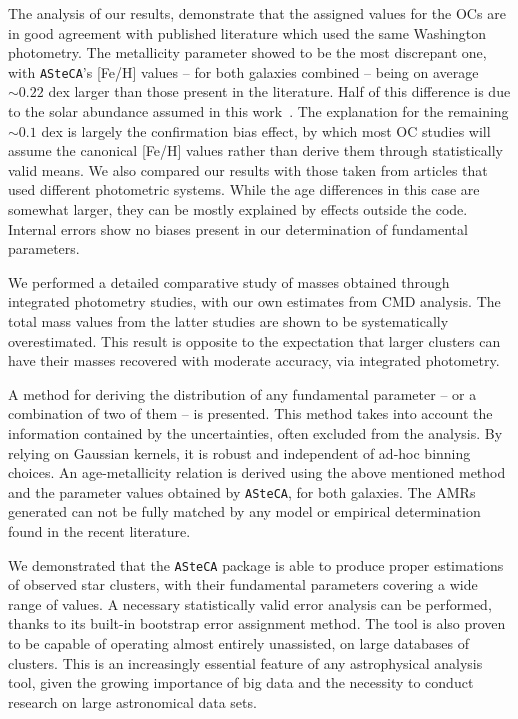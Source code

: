 \documentclass{aa}
\begin{document}
The analysis of our results, demonstrate that the assigned values for the OCs
are in good agreement with published literature which used the same
Washington photometry.
%
The metallicity parameter showed to be the most discrepant one, with \texttt
{ASteCA}'s [Fe/H] values -- for both galaxies combined -- being on average
${\sim}0.22$ dex larger than those present in the literature. Half of this
difference is due to the solar abundance assumed in this work~\citep[$z_{\odot}
{=}0.0152$;][]{Bressan_2012}. The explanation for the remaining ${\sim}0.1$ dex
is largely the confirmation bias effect, by which most OC studies will
assume the canonical [Fe/H] values rather than derive them through statistically
valid means.
%
We also compared our results with those taken from articles that used different
photometric systems. While the age differences in this case are somewhat
larger, they can be mostly explained by effects outside the code.
Internal errors show no biases present in our determination of fundamental
parameters.

We performed a detailed comparative study of masses obtained through integrated
photometry studies, with our own estimates from CMD analysis. The total mass
values from the latter studies are shown to be systematically overestimated.
This result is opposite to the expectation that larger clusters can have their
masses recovered with moderate accuracy, via integrated photometry.

A method for deriving the distribution of any fundamental parameter -- or a
combination of two of them -- is presented. This method takes into account the
information contained by the uncertainties, often excluded from the analysis.
By relying on Gaussian kernels, it is robust and independent of ad-hoc binning
choices.
%
An age-metallicity relation is derived using the above mentioned method and the
parameter values obtained by \texttt{ASteCA}, for both galaxies. The AMRs
generated can not be fully matched by any model or empirical determination found
in the recent literature.

We demonstrated that the \texttt{ASteCA} package is able to produce proper
estimations of observed star clusters, with their fundamental parameters
covering a wide range of values. A necessary statistically valid error analysis
can be performed, thanks to its built-in bootstrap error assignment method.
%
The tool is also proven to be capable of operating almost entirely unassisted,
on large databases of clusters. This is an increasingly essential feature
of any astrophysical analysis tool, given the growing importance of big data and
the necessity to conduct research on large astronomical data sets.
\end{document}
